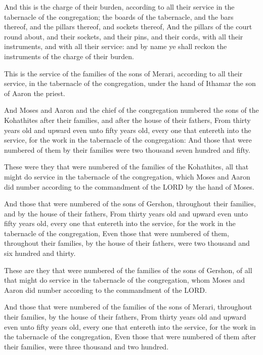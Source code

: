 \verse And this is the charge of their burden, according to all their
service in the tabernacle of the congregation; the boards of the
tabernacle, and the bars thereof, and the pillars thereof, and sockets
thereof, \verse And the pillars of the court round about, and their
sockets, and their pins, and their cords, with all their instruments,
and with all their service: and by name ye shall reckon the
instruments of the charge of their burden.

\verse This is the service of the families of the sons of Merari,
according to all their service, in the tabernacle of the congregation,
under the hand of Ithamar the son of Aaron the priest.

\verse And Moses and Aaron and the chief of the congregation numbered
the sons of the Kohathites after their families, and after the house
of their fathers, \verse From thirty years old and upward even unto
fifty years old, every one that entereth into the service, for the
work in the tabernacle of the congregation: \verse And those that were
numbered of them by their families were two thousand seven hundred and
fifty.

\verse These were they that were numbered of the families of the
Kohathites, all that might do service in the tabernacle of the
congregation, which Moses and Aaron did number according to the
commandment of the LORD by the hand of Moses.

\verse And those that were numbered of the sons of Gershon, throughout
their families, and by the house of their fathers, \verse From thirty
years old and upward even unto fifty years old, every one that
entereth into the service, for the work in the tabernacle of the
congregation, \verse Even those that were numbered of them, throughout
their families, by the house of their fathers, were two thousand and
six hundred and thirty.

\verse These are they that were numbered of the families of the sons of
Gershon, of all that might do service in the tabernacle of the
congregation, whom Moses and Aaron did number according to the
commandment of the LORD.

\verse And those that were numbered of the families of the sons of
Merari, throughout their families, by the house of their fathers, \verse
From thirty years old and upward even unto fifty years old, every one
that entereth into the service, for the work in the tabernacle of the
congregation, \verse Even those that were numbered of them after their
families, were three thousand and two hundred.

